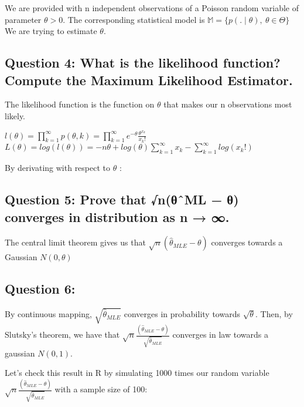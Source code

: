 \documentclass[]{article}
\begin{document}
We are provided with n independent observations of a Poisson random
variable of parameter \(\theta > 0\). The corresponding statistical
model is \(\mathbb{M} = \{p(.\mid \theta),\ \theta \in\Theta \}\) We are
trying to estimate \(\theta\).

\hypertarget{question-4-what-is-the-likelihood-function-compute-the-maximum-likelihood-estimator.}{%
\subsection{Question 4: What is the likelihood function? Compute the
Maximum Likelihood
Estimator.}\label{question-4-what-is-the-likelihood-function-compute-the-maximum-likelihood-estimator.}}

The likelihood function is the function on \(\theta\) that makes our n
observations most likely.

\(l(\theta) = \prod_{k=1}^{\infty} p(\theta,k) = \prod_{k=1}^{\infty} e^{-\theta} \frac{\theta^{x_{k}}}{x_{k}!}\)
\(L(\theta) = log(l(\theta)) = -n\theta + log(\theta)\sum_{k=1}^{\infty}x_{k}-\sum_{k=1}^{\infty}log(x_{k}!)\)

By derivating with respect to \(\theta\) :

\hypertarget{question-5-prove-that-nux3b8ux2c6ml-ux3b8-converges-in-distribution-as-n-.}{%
\subsection{Question 5: Prove that √n(θˆML − θ) converges in
distribution as n →
∞.}\label{question-5-prove-that-nux3b8ux2c6ml-ux3b8-converges-in-distribution-as-n-.}}

The central limit theorem gives us that
\(\sqrt{n}(\hat\theta_{MLE}-\theta)\) converges towards a Gaussian
\(N(0,\theta)\)

\hypertarget{question-6}{%
\subsection{Question 6:}\label{question-6}}

By continuous mapping, \(\sqrt{\hat\theta_{MLE}}\) converges in
probability towards \(\sqrt{\theta}\). Then, by Slutsky's theorem, we
have that
\(\sqrt{n}\frac{(\hat\theta_{MLE}-\theta)}{\sqrt{\hat\theta_{MLE}}}\)
converges in law towards a gaussian \(N(0,1)\).

Let's check this result in R by simulating 1000 times our random
variable
\(\sqrt{n}\frac{(\hat\theta_{MLE}-\theta)}{\sqrt{\hat\theta_{MLE}}}\)
with a sample size of 100:
\end{document}
